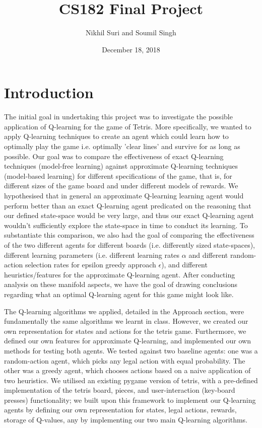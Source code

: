 \documentclass[11pt]{article}
\title{CS182 Final Project}
\author{Nikhil Suri and Soumil Singh}
\date{December 18, 2018}
\begin{document}
\maketitle{}


\section{Introduction}
The initial goal in undertaking this project was to investigate the possible application of Q-learning for the game of Tetris. More specifically, we wanted to apply Q-learning techniques to create an agent which could learn how to optimally play the game i.e. optimally 'clear lines' and survive for as long as possible. Our goal was to compare the effectiveness of exact Q-learning techniques (model-free learning) against approximate Q-learning techniques (model-based learning) for different specifications of the game, that is, for different sizes of the game board and under different models of rewards. We hypothesised that in general an approximate Q-learning learning agent would perform better than an exact Q-learning agent predicated on the reasoning that our defined state-space would be very large, and thus our exact Q-learning agent wouldn't sufficiently explore the state-space in time to conduct its learning. To substantiate this comparison, we also had the goal of comparing the effectiveness of the two different agents for different boards (i.e. differently sized state-spaces), different learning parameters (i.e. different learning rates $\alpha$ and different random-action selection rates for epsilon greedy approach $\epsilon$), and different heuristics/features for the approximate Q-learning agent. After conducting analysis on these manifold aspects, we have the goal of drawing conclusions regarding what an optimal Q-learning agent for this game might look like.

The Q-learning algorithms we applied, detailed in the Approach section, were fundamentally the same algorithms we learnt in class. However, we created our own representation for states and actions for the tetris game. Furthermore, we defined our own features for approximate Q-learning, and implemented our own methods for testing both agents. We tested against two baseline agents: one was a random-action agent, which picks any legal action with equal probability. The other was a greedy agent, which chooses actions based on a naive application of two heuristics. We utilised an existing pygame version of tetris, with a pre-defined implementation of the tetris board, pieces, and user-interaction (key-board presses) functionality; we built upon this framework to implement our Q-learning agents by defining our own representation for states, legal actions, rewards, storage of Q-values, any by implementing our two main Q-learning algorithms.
\end{document}
